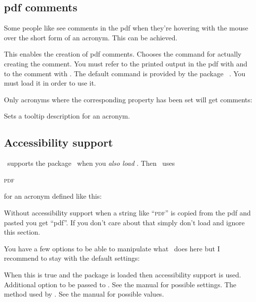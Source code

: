\documentclass{acro-manual}
\begin{document}
\subsection{\acs*{pdf} comments}\label{sec:pdf-comments}
Some people like see comments in the \ac{pdf} when they're hovering with the
mouse over the short form of an acronym.  This can be achieved.
\begin{options}
    This enables the creation of \ac{pdf} comments.
    Chooses the command for actually creating the comment.  You must refer to
    the printed output in the \ac{pdf} with  and to the comment with
    .  The default command  is provided by the
    package ~\cite{pkg:pdfcomment}.  You must load it in order
    to use it.
\end{options}
Only acronyms where the corresponding property has been set will get comments:  
\begin{properties}
    Sets a tooltip description for an acronym.
\end{properties}

\subsection{Accessibility support}\label{sec:access-supp}
\acro\ supports the  package~\cite{pkg:accsupp} when you
\emph{also load }.  Then \acro\ uses
\begin{sourcecode}
    \textsc{pdf}%
  \EndAccSupp{}%
\end{sourcecode}
for an acronym defined like this:
\begin{sourcecode}
\end{sourcecode}
Without accessibility support when a string like \enquote{\textsc{pdf}} is
copied from the \ac{pdf} and pasted you get \enquote{pdf}.  If you don't care
about that simply don't load  and ignore this section.

You have a few options to be able to manipulate what \acro\ does here but I
recommend to stay with the default settings:
\begin{options}
    When this is true and the package  is loaded then
    accessibility support is used.
   \Default
    Additional option to be passed to .  See the
     manual for possible settings.
    The method used by .  See the
     manual for possible values.
\end{options}
\end{document}
